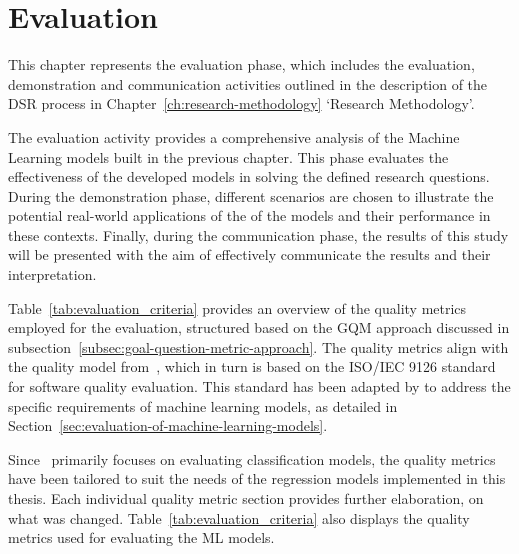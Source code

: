 \chapter{Evaluation}\label{ch:evaluation}
This chapter represents the evaluation phase, which includes the evaluation, demonstration and
communication activities outlined in the description of the \ac{DSR} process in
Chapter~\ref{ch:research-methodology} `Research Methodology'.

The evaluation activity provides a comprehensive analysis of the Machine Learning models built in the
previous chapter.
This phase evaluates the effectiveness of the developed models in solving the defined research questions.
During the demonstration phase, different scenarios are chosen to illustrate the potential real-world applications of
the
of the models and their performance in these contexts.
Finally, during the communication phase, the results of this study will be presented with the aim of effectively
communicate the results and their interpretation.

Table~\ref{tab:evaluation_criteria} provides an overview of the quality metrics employed for the evaluation,
structured based on the \ac{GQM} approach discussed in subsection~\ref{subsec:goal-question-metric-approach}.
The quality metrics align with the quality model from~\cite{siebert2022construction}, which in turn is based on
the ISO/IEC 9126 standard for software quality evaluation.
This standard has been adapted by\cite{siebert2022construction} to address the specific requirements of machine
learning models, as detailed in Section~\ref{sec:evaluation-of-machine-learning-models}.

Since~\cite{siebert2022construction} primarily focuses on evaluating classification models, the quality metrics have
been tailored to suit the needs of the regression models implemented in this thesis.
Each individual quality metric section provides further elaboration, on what was changed.
Table~\ref{tab:evaluation_criteria} also displays the quality metrics used for evaluating the \ac{ML} models.

